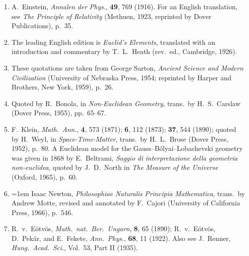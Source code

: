 \begin{enumerate}
  \item {}\label{ch1-ref-1}
  A.\ Einstein, \emph{Annalen der Phys.}, \textbf{49}, 769 (1916). For an
  English translation, see \emph{The Principle of Relativity} (Methuen, 1923,
  reprinted by Dover Publications), p.\ 35.

  \item {}\label{ch1-ref-2}
  The leading English edition is \emph{Euclid's Elements}, translated with an
  introduction and commentary by T.\ L.\ Heath (rev.\ ed., Cambridge, 1926).

  \item {}\label{ch1-ref-3}
  These quotations are taken from George Sarton, \emph{Ancient Science and
  Modern Civilization} (University of Nebraska Press, 1954; reprinted by
  Harper and Brothers, New York, 1959), p.\ 26.

  \item {}\label{ch1-ref-4}
  Quoted by R.\ Bonola, in \emph{Non-Euclidean Geometry}, trans.\ by H.\ S.\
  Carslaw (Dover Press, 1955), pp.\ 65--67.

  \item {}\label{ch1-ref-5}
  F.\ Klein, \emph{Math.\ Ann.}, \textbf{4}, 573 (1871); \textbf{6}, 112
  (1873); \textbf{37}, 544 (1890); quoted by H.\ Weyl, in
  \emph{Space-Time-Matter}, trans.\ by H.\ L.\ Brose (Dover Press, 1952),
  p.\ 80. A Euclidean model for the Gauss--B\'olyai--Lobachevski geometry was
  given in 1868 by E.\ Beltrami, \emph{Saggio di interpretazione della
  geometria non-euclidea}, quoted by J.\ D.\ North in \emph{The Measure of the
  Universe} (Oxford, 1965), p.\ 60.

  \item {}\label{ch1-ref-6}
\begingroup
\emergencystretch=1em
  Isaac Newton, \emph{Philosophiae Naturalis Principia Mathematica}, trans.\
  by Andrew Motte, revised and annotated by F.\ Cajori (University of
  California Press, 1966), p.\ 546.
\par
\endgroup

  \item {}\label{ch1-ref-7}
  R.\ v.\ E\"otv\"os, \emph{Math.\ nat.\ Ber.\ Ungarn}, \textbf{8}, 65
  (1890); R.\ v.\ E\"otv\"os, D.\ Pek\'ar, and E.\ Fekete, \emph{Ann.\
  Phys.}, \textbf{68}, 11 (1922). Also see J.\ Renner, \emph{Hung.\ Acad.\
  Sci.}, Vol.\ 53, Part II (1935).


\end{enumerate}
